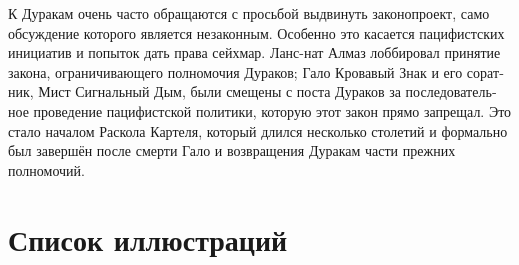 \documentclass[a4paper,12pt,fleqn]{book}\usepackage{polyglossia}\setdefaultlanguage[babelshorthands=true]{russian}\setotherlanguage{english}\defaultfontfeatures{Ligatures=TeX,Mapping=tex-text}\usepackage{xcolor}\newcommand{\ml}[3]{#2}
\begin{document}
{К Дуракам очень часто обращаются с просьбой выдвинуть законопроект, само обсуждение которого является незаконным.
Особенно это касается пацифистских инициатив и попыток дать права сейхмар.
Ланс-нат Алмаз лоббировал принятие закона, ограничивающего полномочия Дураков;
Гало Кровавый Знак и его соратник, Мист Сигнальный Дым, были смещены с поста Дураков за последовательное проведение пацифистской политики, которую этот закон прямо запрещал.
Это стало началом Раскола Картеля, который длился несколько столетий и формально был завершён после смерти Гало и возвращения Дуракам части прежних полномочий.


\section{Список иллюстраций}

}
\end{document}
